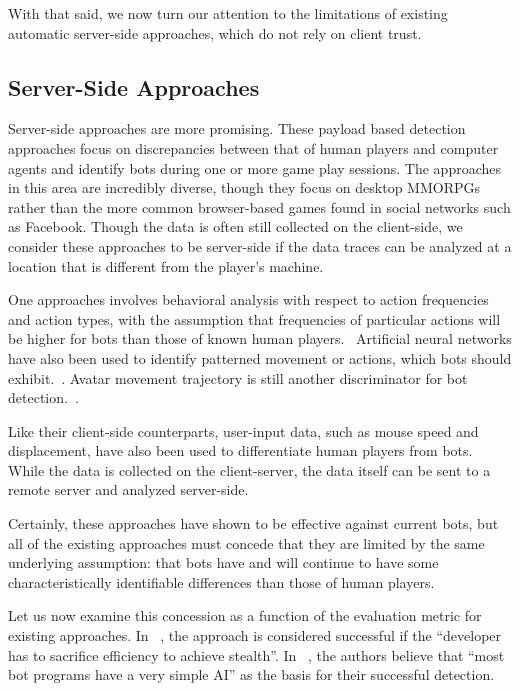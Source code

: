 \documentclass{acm_proc_article-sp}
\begin{document}
With that said, we now turn our attention to the limitations of existing automatic server-side approaches, which do not rely on client trust.

\subsection{Server-Side Approaches}

Server-side approaches are more promising. These payload based detection approaches focus on discrepancies between that of human players and computer agents and identify bots during one or more game play sessions. The approaches in this area are incredibly diverse, though they focus on desktop MMORPGs rather than the more common browser-based games found in social networks such as Facebook. Though the data is often still collected on the client-side, we consider these approaches to be server-side if the data traces can be analyzed at a location that is different from the player's machine.

One approaches involves behavioral analysis with respect to action frequencies and action types, with the assumption that frequencies of particular actions will be higher for bots than those of known human players.~\cite{behavior}  Artificial neural networks have also been used to identify patterned movement or actions, which bots should exhibit.~\cite{ann}. Avatar movement trajectory is still another discriminator for bot detection.~\cite{trajectory}.

Like their client-side counterparts, user-input data, such as mouse speed and displacement, have also been used to differentiate human players from bots. While the data is collected on the client-server, the data itself can be sent to a remote server and analyzed server-side.~\cite{botcraft}

Certainly, these approaches have shown to be effective against current bots, but all of the existing approaches must concede that they are limited by the same underlying assumption: that bots have and will continue to have some characteristically identifiable differences than those of human players. 

Let us now examine this concession as a function of the evaluation metric for existing approaches. In ~\cite{scum}, the approach is considered successful if the ``developer has to sacrifice efficiency to achieve stealth''. In ~\cite{van2009step}, the authors believe that ``most bot programs have a very simple AI'' as the basis for their successful detection. 
\end{document}
